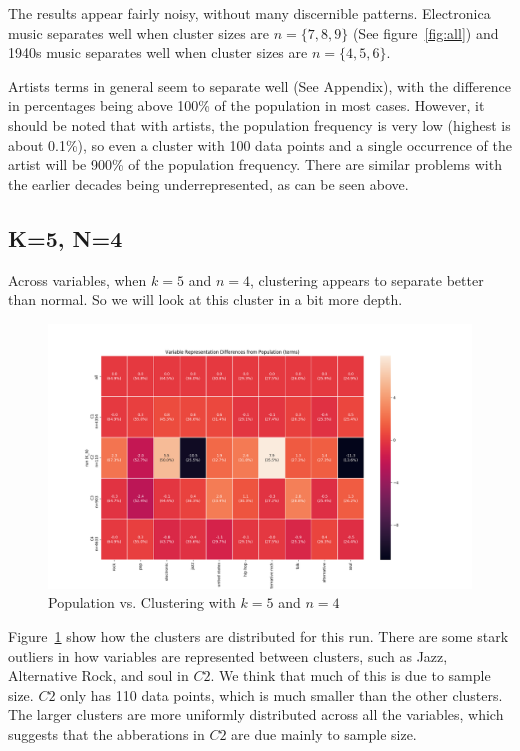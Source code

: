 The results appear fairly noisy, without many discernible patterns.
Electronica music separates well when cluster sizes are $n=\{7,8,9\}$ (See figure~\ref{fig:all})
and 1940s music separates well when cluster sizes are $n=\{4,5,6\}$.

Artists terms in general seem to separate well (See Appendix), with the difference in percentages being
above 100\% of the population in most cases.
However, it should be noted that with artists,
the population frequency is very low (highest is about 0.1\%),
so even a cluster with 100 data points and a single occurrence of the artist will be 900\%
of the population frequency.
There are similar problems with the earlier decades being underrepresented, as can be seen above.

\subsection{K=5, N=4}

Across variables, when $k=5$ and $n=4$, clustering appears to separate better than normal.
So we will look at this cluster in a bit more depth.

\begin{figure}[ht]
    \centering
    \includegraphics[width=1\textwidth]{terms_cluster}
    \caption{Population vs. Clustering with $k=5$ and $n=4$}
    \label{fig:cluster}
\end{figure}

Figure~\ref{fig:cluster} show how the clusters are distributed for this run.
There are some stark outliers in how variables are represented between clusters,
such as Jazz, Alternative Rock, and soul in $C2$.
We think that much of this is due to sample size.
$C2$ only has 110 data points, which is much smaller than the other clusters.
The larger clusters are more uniformly distributed across all the variables,
which suggests that the abberations in $C2$ are due mainly to sample size.


